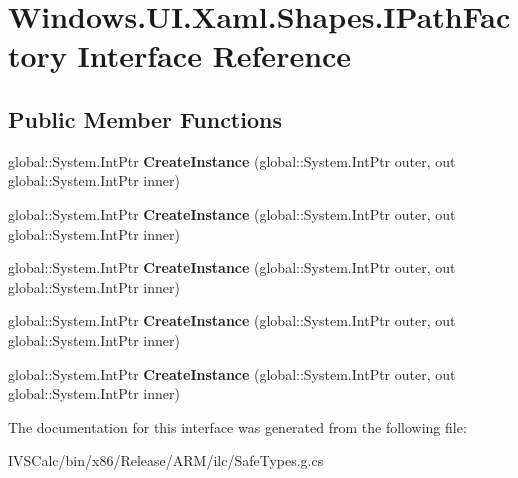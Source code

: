 \hypertarget{interface_windows_1_1_u_i_1_1_xaml_1_1_shapes_1_1_i_path_factory}{}\section{Windows.\+U\+I.\+Xaml.\+Shapes.\+I\+Path\+Factory Interface Reference}
\label{interface_windows_1_1_u_i_1_1_xaml_1_1_shapes_1_1_i_path_factory}
\subsection*{Public Member Functions}
\begin{DoxyCompactItemize}
\item 
\mbox{\label{interface_windows_1_1_u_i_1_1_xaml_1_1_shapes_1_1_i_path_factory_a4a780a6996cc57279d91d0560fe36091}} 
global\+::\+System.\+Int\+Ptr {\bfseries Create\+Instance} (global\+::\+System.\+Int\+Ptr outer, out global\+::\+System.\+Int\+Ptr inner)
\item 
\mbox{\label{interface_windows_1_1_u_i_1_1_xaml_1_1_shapes_1_1_i_path_factory_a4a780a6996cc57279d91d0560fe36091}} 
global\+::\+System.\+Int\+Ptr {\bfseries Create\+Instance} (global\+::\+System.\+Int\+Ptr outer, out global\+::\+System.\+Int\+Ptr inner)
\item 
\mbox{\label{interface_windows_1_1_u_i_1_1_xaml_1_1_shapes_1_1_i_path_factory_a4a780a6996cc57279d91d0560fe36091}} 
global\+::\+System.\+Int\+Ptr {\bfseries Create\+Instance} (global\+::\+System.\+Int\+Ptr outer, out global\+::\+System.\+Int\+Ptr inner)
\item 
\mbox{\label{interface_windows_1_1_u_i_1_1_xaml_1_1_shapes_1_1_i_path_factory_a4a780a6996cc57279d91d0560fe36091}} 
global\+::\+System.\+Int\+Ptr {\bfseries Create\+Instance} (global\+::\+System.\+Int\+Ptr outer, out global\+::\+System.\+Int\+Ptr inner)
\item 
\mbox{\label{interface_windows_1_1_u_i_1_1_xaml_1_1_shapes_1_1_i_path_factory_a4a780a6996cc57279d91d0560fe36091}} 
global\+::\+System.\+Int\+Ptr {\bfseries Create\+Instance} (global\+::\+System.\+Int\+Ptr outer, out global\+::\+System.\+Int\+Ptr inner)
\end{DoxyCompactItemize}


The documentation for this interface was generated from the following file\+:\begin{DoxyCompactItemize}
\item 
I\+V\+S\+Calc/bin/x86/\+Release/\+A\+R\+M/ilc/Safe\+Types.\+g.\+cs\end{DoxyCompactItemize}
